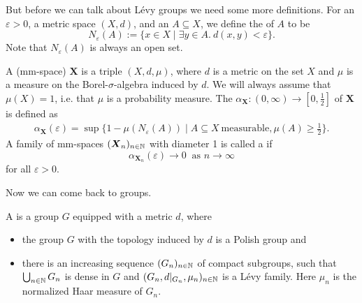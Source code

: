 

But before we can talk about L\'evy groups we need some more definitions. For an $\varepsilon>0$, a metric space $(X,d)$, and an $A\subseteq X$, we define the  of $A$ to be 
\[N_\varepsilon(A):=\{x\in X\mid\exists y\in A.\  d(x,y)<\varepsilon\}.\]
Note that $N_\varepsilon(A)$ is always an open set.
\begin{definition}
A  (mm-space) $\boldsymbol{X}$ is a triple $(X,d,\mu)$, where $d$ is a metric on the set $X$ and $\mu$ is a measure on the Borel-$\sigma$-algebra induced by $d$. We will always assume that $\mu(X)=1$, i.e. that $\mu$ is a probability measure.  
The  $\alpha_{\boldsymbol{X}}\colon(0,\infty)\to[0,\frac{1}{2}]$ of $\boldsymbol{X}$ is defined as 
\begin{align*}
\alpha_{\boldsymbol{X}}(\varepsilon)=\sup\{1-\mu(N_\varepsilon(A))\mid A\subseteq X\ \text{measurable}, \mu(A)\geq\frac{1}{2}\}.
\end{align*}
A family of mm-spaces $(\boldsymbol{X}_n)_{n\in\mathbb{N}}$ with diameter 1 is called a  if 
\[\alpha_{\boldsymbol{X}_n}(\varepsilon)\to 0\ \text{ as $n\to\infty$}\]
for all $\varepsilon>0$.
\end{definition}

Now we can come back to groups.
\begin{definition}\label{def:Levy}
A  is a group $G$ equipped with a metric $d$, where
\begin{itemize}
\item the group $G$ with the topology induced by $d$ is a Polish group and
\item there is an increasing sequence $(G_n)_{n\in\mathbb{N}}$ of compact subgroups, such that $\bigcup_{n\in\mathbb{N}} G_n$ is dense in $G$ and $(G_n,d|_{G_n},\mu_n)_{n\in\mathbb{N}}$ is a L\'evy family. Here $\mu_n$ is the normalized Haar measure of $G_n$.
\end{itemize}  
\end{definition}

